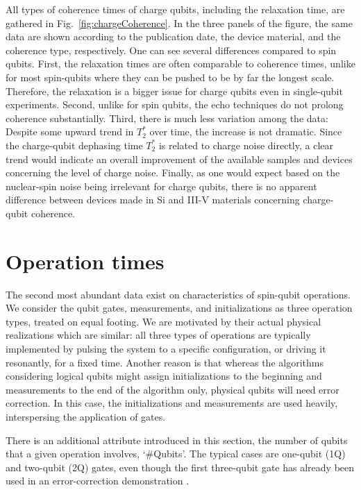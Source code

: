 \documentclass[aps, prx, showpacs, twocolumn, superscriptaddress, notitlepage, longbibliography, floatfix, nofootinbib]{revtex4-2}
\newcommand{\myKey}[1]{$\whitearrowupfrombar$\textit{#1}}
\renewcommand{\myKey}[1]{\textit{#1}}
\renewcommand{\myKey}[1]{`{#1}'}
\newcommand{\recheck}[1]{{#1}}
\begin{document}
All types of coherence times of charge qubits, including the relaxation time, are gathered in Fig.~\ref{fig:chargeCoherence}. In the three panels of the figure, the same data are shown according to the publication date, the device material, and the coherence type, respectively. One can see several differences compared to spin qubits. \recheck{
First, the relaxation times are often comparable to coherence times, unlike for most spin-qubits where they can be pushed to be by far the longest scale.} 
Therefore, the relaxation is a bigger issue for charge qubits even in single-qubit experiments. \recheck{Second, unlike for spin qubits, the echo techniques do not prolong coherence substantially.} \recheck{Third, there is much less variation among the data:} 
\recheck{Despite some upward trend in $T_2^*$ over time, the increase is not dramatic. Since the charge-qubit dephasing time $T_2^*$ is related to charge noise directly, a clear trend would indicate} an overall improvement of the available samples and devices concerning the level of charge noise.
\recheck{Finally, as one would expect based on the nuclear-spin noise being irrelevant for charge qubits, there is no apparent difference between devices made in Si and III-V materials concerning charge-qubit coherence.}

\vspace{-0.3cm}
\section{Operation times}

\label{sec:operations}

The second most abundant data exist on characteristics of spin-qubit operations. We consider the qubit gates, measurements, and initializations as three operation types, treated on equal footing.
We are motivated by their actual physical realizations which are similar: all three types of operations are typically implemented by pulsing the system to a specific configuration, or driving it resonantly, for a fixed time. Another reason is that whereas the algorithms considering logical qubits might assign initializations to the beginning and measurements to the end of the algorithm only, physical qubits will need error correction. In this case, the initializations and measurements are used heavily, interspersing the application of gates.


There is an additional attribute introduced in this section, the number of qubits that a given operation involves, \myKey{\#Qubits}. \recheck{The typical cases are one-qubit (1Q) and two-qubit (2Q) gates, even though the first three-qubit gate has already been used in an error-correction demonstration \cite{takeda_quantum_2022}. 
}
\end{document}
